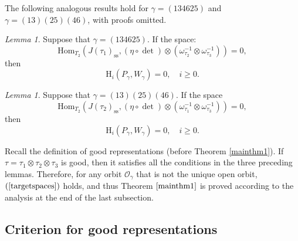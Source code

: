 \documentclass[12pt]{amsart}
\newcommand{\RH}{{\mathrm {H}}}
\newcommand{\Hom}{{\mathrm{Hom}}}
\theoremstyle{Theorem}
\theoremstyle{Theorem}
\theoremstyle{Theorem}
\theoremstyle{Theorem}
\theoremstyle{Plain}
\theoremstyle{remark}
\theoremstyle{remark}
\theoremstyle{Definition}
\newtheorem{lemd}[dfn]{Lemma}
\begin{document}
The following analogous results hold for $ \gamma = (134625) $ and $ \gamma = (13)(25)(46) $, with proofs omitted.

\begin{lemd}
    Suppose that $ \gamma = (134625) $. If the space:
    \[
        \Hom_{T_2}
        \left(
            J( \tau_1 )_\mathrm{ss}, ( \eta \circ \det ) \otimes \left( \omega_{ \tau_2 }^{-1} \otimes \omega_{ \tau_3 }^{-1} \right)
        \right)
        = 0,
    \]
    then 
    \[
        \RH_i \left( P_\gamma, W_\gamma \right) = 0, \quad i \ge 0.
    \]
\end{lemd}

\begin{lemd}
    Suppose that $ \gamma = (13)(25)(46) $. If the space
    \[
        \Hom_{T_2}
        \left(
            J( \tau_2 )_\mathrm{ss}, ( \eta \circ \det ) \otimes \left( \omega_{ \tau_1 }^{-1} \otimes \omega_{ \tau_3 }^{-1} \right)
        \right)
        = 0, 
    \]
    then 
    \[
        \RH_i \left( P_\gamma, W_\gamma \right) = 0, \quad i \ge 0.
    \]
\end{lemd}
Recall the definition of good representations (before Theorem \ref{mainthm1}). If $ \tau = \tau_1 \otimes \tau_2 \otimes \tau_3 $ is good, then it satisfies all the conditions in the three preceding lemmas. Therefore, for any orbit $ \mathcal{O}_\gamma $ that is not the unique open orbit, $ ( \ref{targetspaces} ) $ holds, and thus Theorem $ \ref{mainthm1} $ is proved according to the analysis at the end of the last subsection.

\subsection{Criterion for good representations}
\end{document}
